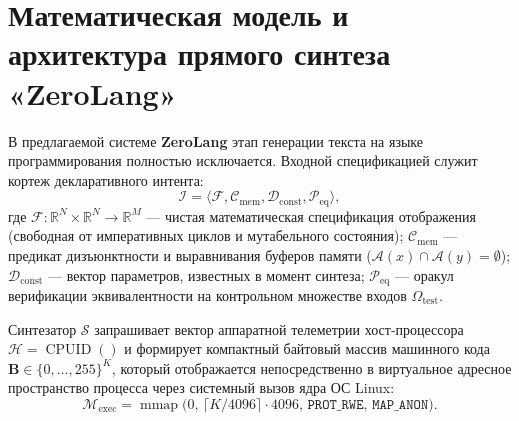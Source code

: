\documentclass[11pt,a4paper]{article}
\begin{document}
\section{Математическая модель и архитектура прямого синтеза «ZeroLang»}

В предлагаемой системе \textbf{ZeroLang} этап генерации текста на языке программирования полностью исключается. Входной спецификацией служит кортеж декларативного интента:
\begin{equation}
    \mathcal{I} = \langle \mathcal{F}, \mathcal{C}_{\text{mem}}, \mathcal{D}_{\text{const}}, \mathcal{P}_{\text{eq}} \rangle,
\end{equation}
где $\mathcal{F}: \mathbb{R}^N \times \mathbb{R}^N \to \mathbb{R}^M$ — чистая математическая спецификация отображения (свободная от императивных циклов и мутабельного состояния); $\mathcal{C}_{\text{mem}}$ — предикат дизъюнктности и выравнивания буферов памяти ($\mathcal{A}(x) \cap \mathcal{A}(y) = \emptyset$); $\mathcal{D}_{\text{const}}$ — вектор параметров, известных в момент синтеза; $\mathcal{P}_{\text{eq}}$ — оракул верификации эквивалентности на контрольном множестве входов $\Omega_{\text{test}}$.

Синтезатор $\mathcal{S}$ запрашивает вектор аппаратной телеметрии хост-процессора $\mathcal{H} = \operatorname{CPUID}()$ и формирует компактный байтовый массив машинного кода $\mathbf{B} \in \{0,\dots,255\}^K$, который отображается непосредственно в виртуальное адресное пространство процесса через системный вызов ядра ОС Linux:
\begin{equation}
    \mathcal{M}_{\text{exec}} = \operatorname{mmap}\bigl(0, \, \lceil K / 4096 \rceil \cdot 4096, \, \texttt{PROT\_RWE}, \, \texttt{MAP\_ANON}\bigr).
\end{equation}
\end{document}
